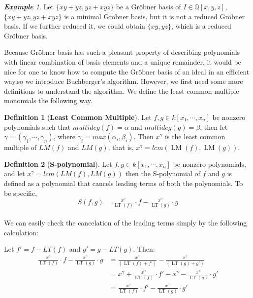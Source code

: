 \documentclass{article}
\newcommand{\lm}{\ensuremath{\operatorname{LM}}}
\newcommand{\lt}{\ensuremath{\operatorname{LT}}}
\theoremstyle{definition}
\newtheorem{definition}{Definition}[section]
\theoremstyle{remark}
\theoremstyle{example}
\newtheorem{example}{\textbf{Example}}[section]
\begin{document}
\begin{example}
    Let $\{xy+yz,yz+xyz\}$ be a Gröbner basis of $I \in \mathbb{Q}[x,y,z]$, $\{xy+yz,yz+xyz\}$ is a minimal Gröbner basis, but it is not a reduced Gröbner basis. If we further reduced it, we could obtain $\{xy,yz\}$, which is a reduced Gröbner basis.
\end{example}

Because Gröbner basis has such a pleasant property of describing polynomials with linear combination of basis elements and a unique remainder, it would be nice for one to know how to compute the Gröbner basis of an ideal in an efficient way,so we introduce Buchberger's algorithm. However, we first need some more definitions to understand the algorithm. We define the least common multiple monomials the following way.

\begin{definition}[\textbf{Least Common Multiple}]
    Let $f, g \in k[x_1, \cdots, x_n]$ be nonzero polynomials such that $multideg(f) = \alpha$ and $multideg(g) = \beta$, then let $\gamma = (\gamma_1, \cdots, \gamma_n)$, where $\gamma_i = max(\alpha_i,\beta_i)$. Then $x^{\gamma}$ is the least common multiple of $LM(f)$ and $LM(g)$, that is, $x^{\gamma} = lcm(\lm(f), \lm(g))$.
\end{definition}

\begin{definition}[\textbf{S-polynomial}]
    Let $f, g \in k[x_1, \cdots, x_n]$ be nonzero polynomials, and let $x^{\gamma} = lcm(LM(f), LM(g))$ then the S-polynomial of $f$ and $g$ is defined as a polynomial that cancels leading terms of both the polynomials. To be specific,
    \begin{equation}
        S(f,g) = \tfrac{x^{\gamma}}{\lt(f)} \cdot f - \tfrac{x^{\gamma}}{\lt(g)}\cdot g
    \end{equation}
\end{definition}

\paragraph{  }
We can easily check the cancelation of the leading terms simply by the following calculation:

Let $f' = f - LT(f)$ and $g' = g - LT(g)$. Then:
\begin{align}
    \tfrac{x^{\gamma}}{\lt(f)} \cdot f - \tfrac{x^{\gamma}}{\lt(g)} \cdot g &= \tfrac{x^{\gamma}}{(\lt(f) + f')} - \tfrac{x^{\gamma}}{(\lt(g) + g')}\\
    &= x^{\gamma} + \tfrac{x^{\gamma}}{\lt(f)} \cdot f' - x^{\gamma} - \tfrac{x^{\gamma}}{\lt(g)} \cdot g'\\
    &= \tfrac{x^{\gamma}}{\lt(f)} \cdot f' - \tfrac{x^{\gamma}}{\lt(g)} \cdot g' 
\end{align}
\end{document}
